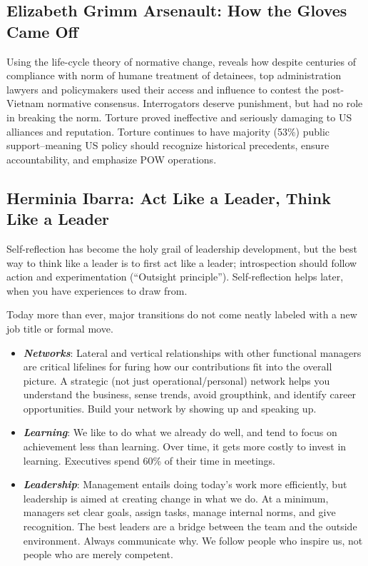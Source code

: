 \documentclass[
]{article}
\begin{document}
\hypertarget{elizabeth-grimm-arsenault-how-the-gloves-came-off}{%
\subsection{Elizabeth Grimm Arsenault: How the Gloves Came
Off}\label{elizabeth-grimm-arsenault-how-the-gloves-came-off}}

Using the life-cycle theory of normative change, reveals how despite
centuries of compliance with norm of humane treatment of detainees, top
administration lawyers and policymakers used their access and influence
to contest the post-Vietnam normative consensus. Interrogators deserve
punishment, but had no role in breaking the norm. Torture proved
ineffective and seriously damaging to US alliances and reputation.
Torture continues to have majority (53\%) public support--meaning US
policy should recognize historical precedents, ensure accountability,
and emphasize POW operations.

\hypertarget{herminia-ibarra-act-like-a-leader-think-like-a-leader}{%
\subsection{Herminia Ibarra: Act Like a Leader, Think Like a
Leader}\label{herminia-ibarra-act-like-a-leader-think-like-a-leader}}

Self-reflection has become the holy grail of leadership development, but
the best way to think like a leader is to first act like a leader;
introspection should follow action and experimentation (``Outsight
principle''). Self-reflection helps later, when you have experiences to
draw from.

Today more than ever, major transitions do not come neatly labeled with
a new job title or formal move.

\begin{itemize}
\item
  \textbf{\emph{Networks}}: Lateral and vertical relationships with
  other functional managers are critical lifelines for furing how our
  contributions fit into the overall picture. A strategic (not just
  operational/personal) network helps you understand the business, sense
  trends, avoid groupthink, and identify career opportunities. Build
  your network by showing up and speaking up.
\item
  \textbf{\emph{Learning}}: We like to do what we already do well, and
  tend to focus on achievement less than learning. Over time, it gets
  more costly to invest in learning. Executives spend 60\% of their time
  in meetings.
\item
  \textbf{\emph{Leadership}}: Management entails doing today's work more
  efficiently, but leadership is aimed at creating change in what we do.
  At a minimum, managers set clear goals, assign tasks, manage internal
  norms, and give recognition. The best leaders are a bridge between the
  team and the outside environment. Always communicate why. We follow
  people who inspire us, not people who are merely competent.
\end{itemize}
\end{document}
